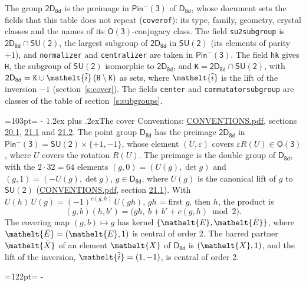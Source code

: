 \documentclass[10pt,a4paper]{article}
\makeatletter
\renewcommand\section{\@startsection{section}{1}{\z@}{-3ex plus -1ex minus -.2ex}%
  {1.2ex plus .2ex}{\normalfont\large\sffamily\bfseries\color{parttitle}}}
\newcommand{\needspace}[1]{\par\penalty-100\begingroup\dimen0=#1\relax\dimen2=\pagegoal
  \advance\dimen2-\pagetotal\ifdim\dimen0>\dimen2\relax\ifdim\dimen2>0pt\vfil\break\fi\fi
  \endgroup}
\numberwithin{equation}{section}
\newcommand{\eltfont}[1]{{\let\sigma\eltsigma\mathelt{#1}}}
\newcommand{\grp}[1]{\mathsf{#1}}
\newcommand{\elt}[1]{\eltfont{#1}}
\newcommand{\dirprod}{\times}
\newcommand{\barred}[1]{\bar{#1}}
\newcommand{\lift}[1]{\tilde{#1}}
\makeatother
\begin{document}
\leavevmode\label{n:element.inversion}\label{n:group.preimage}The group $\grp{2D_{8d}}$ is the preimage in $\grp{Pin^{-}(3)}$ of \href{../../../rotation/data/pdf/D8d.pdf}{$\grp{D_{8d}}$}, whose document sets the fields that this table does not repeat (\texttt{coverof}): its type, family, geometry, crystal classes and the names of its \href{../../../rotation/data/pdf/O3.pdf}{$\grp{O(3)}$}-conjugacy class. The field \texttt{su2subgroup} is $\grp{2D_{8d}} \cap \grp{SU(2)}$, the largest subgroup of $\grp{2D_{8d}}$ in $\grp{SU(2)}$ (its elements of parity $+1$), and \texttt{normalizer} and \texttt{centralizer} are taken in $\grp{Pin^{-}(3)}$. The field \texttt{hk} gives \texttt{H}, the subgroup of $\grp{SU(2)}$ isomorphic to $\grp{2D_{8d}}$, and \texttt{K}${} = \grp{2D_{8d}} \cap \grp{SU(2)}$, with $\grp{2D_{8d}} = \texttt{K} \cup \elt{\lift{i}}\,(\texttt{H} \setminus \texttt{K})$ as sets, where $\elt{\lift{i}}$ is the lift of the inversion $-1$ (section~\ref{s:cover}). The fields \texttt{center} and \texttt{commutatorsubgroup} are classes of the table of section~\ref{s:subgroups}.
\needspace{103pt}
\section{The cover}\label{s:cover}
Conventions: \href{../../CONVENTIONS.pdf}{CONVENTIONS.pdf}, sections \href{../../CONVENTIONS.pdf\#conv.20.1}{20.1}, \href{../../CONVENTIONS.pdf\#conv.21.1}{21.1} and \href{../../CONVENTIONS.pdf\#conv.21.2}{21.2}.
\leavevmode\label{n:group.pin.minus}\label{n:group.su2}\label{n:local.pin.sign}\label{n:matrix.covered}\label{n:matrix.lift.su2}\label{n:index.bar}The point group $\grp{D_{8d}}$ has the preimage $\grp{2D_{8d}}$ in $\grp{Pin^{-}(3)} = \grp{SU(2)} \dirprod \{+1, -1\}$, whose element $(U, \varepsilon)$ covers $\varepsilon R(U) \in \grp{O(3)}$, where $U$ covers the rotation $R(U)$. The preimage is the double group of $\grp{D_{8d}}$, with the $2 \cdot 32 = 64$ elements $(g, 0) = (U(g), \det g)$ and $(g, 1) = (-U(g), \det g)$, $g \in \grp{D_{8d}}$, where $U(g)$ is the canonical lift of $g$ to $\grp{SU(2)}$ (\href{../../CONVENTIONS.pdf}{CONVENTIONS.pdf}, section \href{../../CONVENTIONS.pdf\#conv.21.1}{21.1}). \label{n:function.cocycle}With $U(h)\,U(g) = (-1)^{c(g,h)}\,U(gh)$, $gh$ = first $g$, then $h$, the product is
\begin{equation}\label{e:product}(g, b)(h, b') = \bigl(gh,\ b + b' + c(g, h) \bmod 2\bigr).\end{equation}
\leavevmode\label{n:mark.bar}The covering map $(g, b) \mapsto g$ has kernel $\{\elt{E}, \elt{\barred{E}}\}$, where $\elt{\barred{E}} = (\elt{E}, 1)$ is central of order 2. \label{n:element.named}\label{n:mark.lift}The barred partner $\elt{\barred{X}}$ of an element $\elt{X}$ of $\grp{D_{8d}}$ is $(\elt{X}, 1)$, and the lift of the inversion, $\elt{\lift{i}} = (1, -1)$, is central of order 2.
\needspace{122pt}
\end{document}
